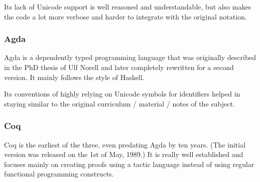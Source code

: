 Its lack of Unicode support is well reasoned and understandable, but also makes the code a lot more verbose and harder to integrate with the original notation.

\subsubsection{Agda}
Agda is a dependently typed programming language that was originally described in the PhD thesis of Ulf Norell\cite{norell:thesis} and later completely rewritten for a second version. It mainly follows the style of Haskell.

Its conventions of highly relying on Unicode symbols for identifiers helped in staying similar to the original curriculum / material / notes of the subject.

\subsubsection{Coq}
Coq is the earliest of the three, even predating Agda by ten years. (The initial version was released on the 1st of May, 1989.) It is really well established and focuses mainly on creating proofs using a tactic language instead of using regular functional programming constructs.